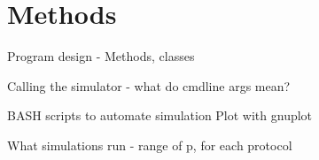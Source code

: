 \documentclass[twocolumn]{article}
\begin{document}

\section*{Methods}

    Program design
        - Methods, classes

    Calling the simulator - what do cmdline args mean?

    BASH scripts to automate simulation
    Plot with gnuplot

    What simulations run - range of p, for each protocol

    

\end{document}
